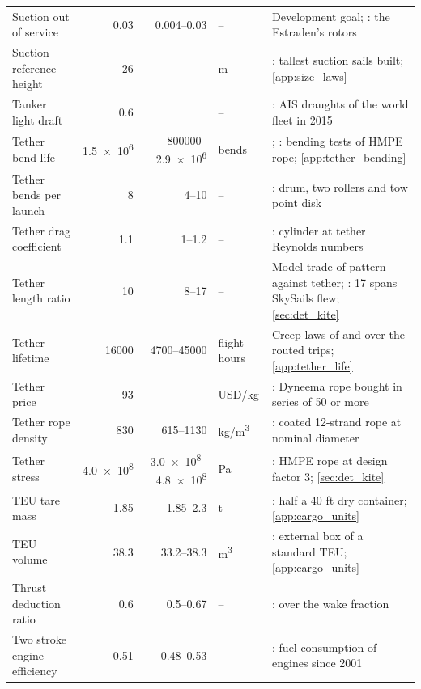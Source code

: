 \begin{longtable}{@{}>{\raggedright\arraybackslash}p{3.4cm}rr>{\raggedright\arraybackslash}p{1.4cm}>{\raggedright\arraybackslash}p{5.8cm}@{}}
Suction out of service & \num{0.03} & \num{0.004}--\num{0.03} & -- & Development goal; \citet{spliethoff2021}: the Estraden's rotors \\
Suction reference height & \num{26} &  & m & \citet{offshoreenergy2025orchard}: tallest suction sails built; \cref{app:size_laws} \\
Tanker light draft & \num{0.6} &  & -- & \citet[Appendix J]{olmer2017}: AIS draughts of the world fleet in 2015 \\
Tether bend life & \num{1.5e6} & \num{800000}--\num{2.9e6} & bends & \citet{bosman2013}; \citet{davies2015}: bending tests of HMPE rope; \cref{app:tether_bending} \\
Tether bends per launch & \num{8} & \num{4}--\num{10} & -- & \citet{skysails_patent_US11578697}: drum, two rollers and tow point disk \\
Tether drag coefficient & \num{1.1} & \num{1}--\num{1.2} & -- & \citet[Table 1]{vandervlugt2019}: cylinder at tether Reynolds numbers \\
Tether length ratio & \num{10} & \num{8}--\num{17} & -- & Model trade of pattern against tether; \citet{paulig2013}: 17 spans SkySails flew; \cref{sec:det_kite} \\
Tether lifetime & \num{16000} & \num{4700}--\num{45000} & flight hours & Creep laws of \citet{humeau2018} and \citet{bosman2013} over the routed trips; \cref{app:tether_life} \\
Tether price & \num{93} &  & USD/kg & \citet[p. 703]{joshi2025}: Dyneema rope bought in series of 50 or more \\
Tether rope density & \num{830} & \num{615}--\num{1130} & kg/m\textsuperscript{3} & \citet[Table 33.4]{bosman2013}: coated 12-strand rope at nominal diameter \\
Tether stress & \num{4.0e8} & \num{3.0e8}--\num{4.8e8} & Pa & \citet[Table 33.4]{bosman2013}: HMPE rope at design factor 3; \cref{sec:det_kite} \\
TEU tare mass & \num{1.85} & \num{1.85}--\num{2.3} & t & \citet{hapaglloyd_container_spec}: half a 40 ft dry container; \cref{app:cargo_units} \\
TEU volume & \num{38.3} & \num{33.2}--\num{38.3} & m\textsuperscript{3} & \citet[p. 5]{mao2020icct}: external box of a standard TEU; \cref{app:cargo_units} \\
Thrust deduction ratio & \num{0.6} & \num{0.5}--\num{0.67} & -- & \citet{man2011}: over the wake fraction \\
Two stroke engine efficiency & \num{0.51} & \num{0.48}--\num{0.53} & -- & \citet[Table 19]{faber2020}: fuel consumption of engines since 2001 \\

\end{longtable}
